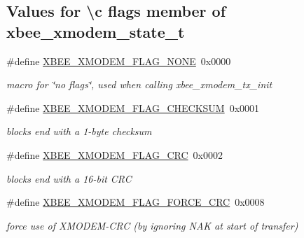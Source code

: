 \subsection*{Values for \textbackslash{}c flags member of xbee\+\_\+xmodem\+\_\+state\+\_\+t}
\begin{DoxyCompactItemize}
\item 
\mbox{\label{group__util__xmodem_ga04349c37c905b515c4a61bbfbfefcac9}} 
\#define \hyperlink{group__util__xmodem_ga04349c37c905b515c4a61bbfbfefcac9}{X\+B\+E\+E\+\_\+\+X\+M\+O\+D\+E\+M\+\_\+\+F\+L\+A\+G\+\_\+\+N\+O\+NE}~0x0000
\begin{DoxyCompactList}\small\item\em macro for \char`\"{}no flags\char`\"{}, used when calling xbee\+\_\+xmodem\+\_\+tx\+\_\+init \end{DoxyCompactList}\item 
\mbox{\label{group__util__xmodem_ga3410ae9b9e3d434bb735ba6b6705f9f4}} 
\#define \hyperlink{group__util__xmodem_ga3410ae9b9e3d434bb735ba6b6705f9f4}{X\+B\+E\+E\+\_\+\+X\+M\+O\+D\+E\+M\+\_\+\+F\+L\+A\+G\+\_\+\+C\+H\+E\+C\+K\+S\+UM}~0x0001
\begin{DoxyCompactList}\small\item\em blocks end with a 1-\/byte checksum \end{DoxyCompactList}\item 
\mbox{\label{group__util__xmodem_ga84ededd1cb6ac229e18cd5936943aa9e}} 
\#define \hyperlink{group__util__xmodem_ga84ededd1cb6ac229e18cd5936943aa9e}{X\+B\+E\+E\+\_\+\+X\+M\+O\+D\+E\+M\+\_\+\+F\+L\+A\+G\+\_\+\+C\+RC}~0x0002
\begin{DoxyCompactList}\small\item\em blocks end with a 16-\/bit C\+RC \end{DoxyCompactList}\item 
\mbox{\label{group__util__xmodem_ga6c1de4e76820a95412e7db3faa9fd250}} 
\#define \hyperlink{group__util__xmodem_ga6c1de4e76820a95412e7db3faa9fd250}{X\+B\+E\+E\+\_\+\+X\+M\+O\+D\+E\+M\+\_\+\+F\+L\+A\+G\+\_\+\+F\+O\+R\+C\+E\+\_\+\+C\+RC}~0x0008
\begin{DoxyCompactList}\small\item\em force use of X\+M\+O\+D\+E\+M-\/\+C\+RC (by ignoring N\+AK at start of transfer) \end{DoxyCompactList}\item 

\end{DoxyCompactItemize}
